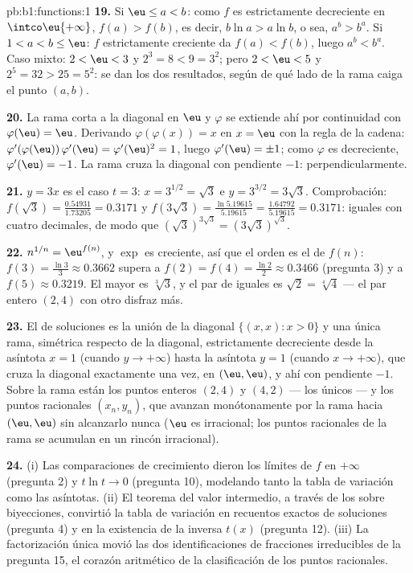 \begin{solution}{pb:b1:functions:1}
\textbf{19.} Si $\eu \leq a < b$: como $f$ es estrictamente decreciente
en $\intco\eu{+\infty}$, $f(a) > f(b)$, es decir, $b\ln a > a\ln b$, o
sea, $a^b > b^a$. Si $1 < a < b \leq \eu$: $f$ estrictamente creciente
da $f(a) < f(b)$, luego $a^b < b^a$. Caso mixto: $2 < \eu < 3$ y
$2^3 = 8 < 9 = 3^2$; pero $2 < \eu < 5$ y $2^5 = 32 > 25 = 5^2$: se dan
los dos resultados, según de qué lado de la rama caiga el punto
$(a, b)$.

\textbf{20.} La rama corta a la diagonal en $\eu$ y $\varphi$ se
extiende ahí por continuidad con $\varphi(\eu) = \eu$. Derivando
$\varphi(\varphi(x)) = x$ en $x = \eu$ con la regla de la cadena:
$\varphi'(\varphi(\eu))\,\varphi'(\eu) = \varphi'(\eu)^2 = 1$, luego
$\varphi'(\eu) = \pm1$; como $\varphi$ es decreciente,
$\varphi'(\eu) = -1$. La rama cruza la diagonal con pendiente $-1$:
perpendicularmente.

\textbf{21.} $y = 3x$ es el caso $t = 3$: $x = 3^{1/2} = \sqrt3$ e
$y = 3^{3/2} = 3\sqrt3$. Comprobación: $f(\sqrt3) =
\frac{0.54931}{1.73205} = 0.3171$ y $f(3\sqrt3) =
\frac{\ln 5.19615}{5.19615} = \frac{1.64792}{5.19615} = 0.3171$:
iguales con cuatro decimales, de modo que
$(\sqrt3)^{3\sqrt3} = (3\sqrt3)^{\sqrt3}$.

\textbf{22.} $n^{1/n} = \eu^{f(n)}$, y $\exp$ es creciente, así que el
orden es el de $f(n)$: $f(3) = \frac{\ln3}3 \approx 0.3662$ supera a
$f(2) = f(4) = \frac{\ln2}2 \approx 0.3466$ (pregunta 3) y a
$f(5) \approx 0.3219$. El mayor es $\sqrt[3]3$, y el par de iguales es
$\sqrt2 = \sqrt[4]4$ --- el par entero $(2, 4)$ con otro disfraz más.

\textbf{23.} El  de soluciones es la unión de la diagonal
$\{(x, x) : x > 0\}$ y una única rama, simétrica respecto de la
diagonal, estrictamente decreciente desde la asíntota $x = 1$ (cuando
$y \to +\infty$) hasta la asíntota $y = 1$ (cuando $x \to +\infty$),
que cruza la diagonal exactamente una vez, en $(\eu, \eu)$, y ahí con
pendiente $-1$. Sobre la rama están los puntos enteros $(2, 4)$ y
$(4, 2)$ --- los únicos --- y los puntos racionales $(x_n, y_n)$, que
avanzan monótonamente por la rama hacia $(\eu, \eu)$ sin alcanzarlo
nunca ($\eu$ es irracional; los puntos racionales de la rama se
acumulan en un rincón irracional).

\textbf{24.} (i) Las comparaciones de crecimiento dieron los límites
de $f$ en $+\infty$ (pregunta 2) y $t\ln t \to 0$ (pregunta 10),
modelando tanto la tabla de variación como las asíntotas. (ii) El
teorema del valor intermedio, a través de los  sobre
biyecciones, convirtió la tabla de variación en recuentos exactos de
soluciones (pregunta 4) y en la existencia de la  inversa
$t(x)$ (pregunta 12). (iii) La factorización única movió las dos
identificaciones de fracciones irreducibles de la pregunta 15, el
corazón aritmético de la clasificación de los puntos racionales.


\end{solution}
